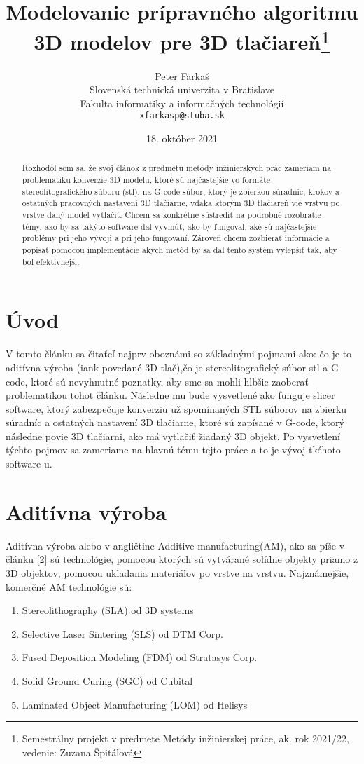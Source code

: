 \documentclass[10pt,twoside,slovak,a4paper]{article}
\title{Modelovanie prípravného algoritmu 3D modelov pre 3D tlačiareň\thanks{Semestrálny projekt v predmete Metódy inžinierskej práce, ak. rok 2021/22, vedenie: Zuzana Špitálová}} %
\author{Peter Farkaš\\[2pt]
	{\small Slovenská technická univerzita v Bratislave}\\
	{\small Fakulta informatiky a informačných technológií}\\
	{\small \texttt{xfarkasp@stuba.sk}}
	}
\date{\small 18. október 2021} %
\begin{document}
\maketitle

\newpage
\begin{abstract}
Rozhodol som sa, že svoj článok z predmetu metódy inžinierskych prác zameriam na problematiku konverzie 3D modelu, ktoré sú najčastejšie vo formáte stereolitografického súboru (stl), na G-code súbor, ktorý je zbierkou súradníc, krokov a ostatných pracovných nastavení 3D tlačiarne, vďaka ktorým 3D tlačiareň vie vrstvu po vrstve daný model vytlačiť. Chcem sa konkrétne sústrediť na podrobné rozobratie témy, ako by sa takýto software dal vyvinúť, ako by fungoval, aké sú najčastejšie problémy pri jeho vývoji a pri jeho fungovaní. Zároveň chcem zozbierať informácie a popísať pomocou implementácie akých metód by sa dal tento systém vylepšiť tak, aby bol efektívnejší.
\end{abstract}

\section{Úvod}
V tomto článku sa čitaťeľ najprv oboznámi so základnými pojmami ako: čo je to aditívna výroba (iank povedané 3D tlač),čo je stereolitografický súbor stl a G-code, ktoré sú nevyhnutné poznatky, aby sme sa mohli hlbšie zaoberať problematikou tohot článku. Následne mu bude vysvetlené ako funguje slicer software, ktorý zabezpečuje konverziu už spomínaných STL súborov na zbierku súradníc a ostatných nastavení 3D tlačiarne, ktoré sú zapísané v G-code, ktorý následne povie 3D tlačiarni, ako má vytlačiť žiadaný 3D objekt. Po vysvetlení týchto pojmov sa zameriame na hlavnú tému tejto práce a to je vývoj tkéhoto software-u. 

\section{Aditívna výroba}
Aditívna výroba alebo v angličtine Additive manufacturing(AM), ako sa píše v článku [2] sú technológie, pomocou ktorých sú vytvárané solídne objekty priamo z 3D objektov, pomocou ukladania materiálov  po vrstve na vrstvu. 
Najznámejšie, komerčné AM technológie sú:

\begin{enumerate}
    \item Stereolithography (SLA) od 3D systems
    \item Selective Laser Sintering  (SLS) od DTM Corp.
    \item Fused  Deposition  Modeling (FDM) od Stratasys  Corp.
    \item Solid  Ground  Curing  (SGC)  od Cubital
    \item Laminated Object Manufacturing (LOM) od Helisys
\end{enumerate}
\end{document}
